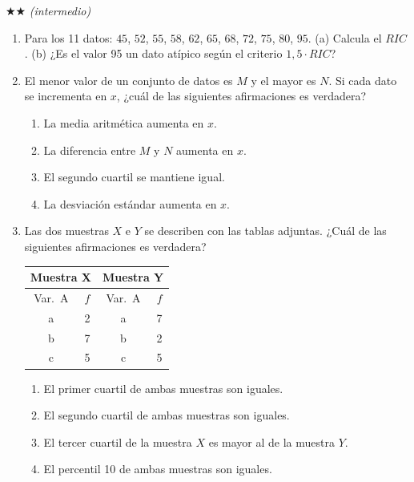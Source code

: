 \documentclass[11pt, letterpaper]{article}
\begin{document}
$\bigstar\bigstar$ \textit{(intermedio)}

\begin{enumerate}[label=\textbf{\arabic*.}, leftmargin=*, resume]
  \item Para los 11 datos: $45$, $52$, $55$, $58$, $62$, $65$, $68$, $72$, $75$, $80$, $95$.
  (a) Calcula el $RIC$.
  (b) ¿Es el valor 95 un dato atípico según el criterio $1{,}5 \cdot RIC$?

  \item El menor valor de un conjunto de datos es $M$ y el mayor es $N$. Si cada dato se incrementa en $x$, ¿cuál de las siguientes afirmaciones es verdadera?
  \begin{enumerate}[label=\Alph*),leftmargin=14pt]
    \item La media aritmética aumenta en $x$.
    \item La diferencia entre $M$ y $N$ aumenta en $x$.
    \item El segundo cuartil se mantiene igual.
    \item La desviación estándar aumenta en $x$.
  \end{enumerate}

  \item Las dos muestras $X$ e $Y$ se describen con las tablas adjuntas. ¿Cuál de las siguientes afirmaciones es verdadera?
  \begin{center}
  \small
  \renewcommand{\arraystretch}{1.15}
  \begin{tabular}{|c|c||c|c|}
  \hline \multicolumn{2}{|c||}{Muestra X} & \multicolumn{2}{c|}{Muestra Y}\\\hline
  Var.\ A & $f$ & Var.\ A & $f$\\\hline
  a & 2 & a & 7\\\hline b & 7 & b & 2\\\hline c & 5 & c & 5\\\hline
  \end{tabular}
  \end{center}
  \begin{enumerate}[label=\Alph*),leftmargin=14pt]
    \item El primer cuartil de ambas muestras son iguales.
    \item El segundo cuartil de ambas muestras son iguales.
    \item El tercer cuartil de la muestra $X$ es mayor al de la muestra $Y$.
    \item El percentil 10 de ambas muestras son iguales.
  \end{enumerate}
\end{enumerate}
\end{document}
